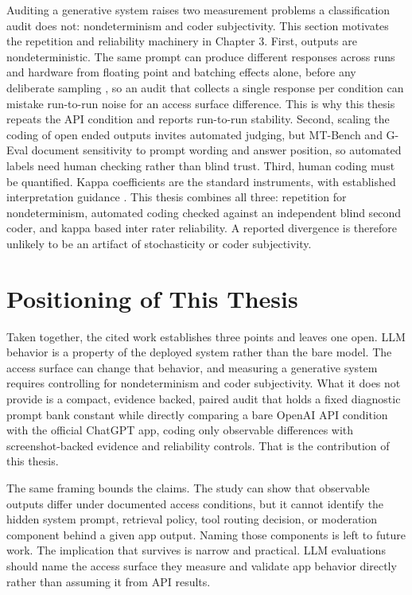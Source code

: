 Auditing a generative system raises two measurement problems a classification
audit does not: nondeterminism and coder subjectivity. This section
motivates the repetition and reliability machinery in Chapter 3. First, outputs
are nondeterministic. The same prompt can produce different responses across runs
and hardware from floating point and batching effects alone, before any deliberate
sampling \parencite{llm_nondeterminism}, so an
audit that collects a single response per condition can mistake run-to-run noise
for an access surface difference. This is why this thesis repeats the API
condition and reports run-to-run stability. Second, scaling the coding of
open ended outputs invites automated judging, but MT-Bench \parencite{mtbench}
and G-Eval \parencite{geval} document sensitivity to prompt wording and answer
position, so automated labels need human checking rather than blind trust. Third,
human coding must be quantified. Kappa coefficients are the standard instruments,
with established interpretation guidance
\parencite{cohen_kappa,fleiss_kappa,mchugh_kappa}. This
thesis combines all three: repetition for nondeterminism, automated coding
checked against an independent blind second coder, and kappa based inter rater
reliability. A reported divergence is therefore unlikely to be an artifact of
stochasticity or coder subjectivity.

\section{Positioning of This Thesis}

Taken together, the cited work establishes three points and leaves one open. LLM
behavior is a property of the deployed system rather than the bare model. The
access surface can change that behavior, and measuring a generative system
requires controlling for nondeterminism and coder subjectivity. What it does not
provide is a compact, evidence backed, paired audit that holds a fixed diagnostic
prompt bank constant while directly comparing a bare OpenAI API condition with the
official ChatGPT app, coding only observable differences with screenshot-backed
evidence and reliability controls. That is the contribution of this thesis.

The same framing bounds the claims. The study can show that observable outputs
differ under documented access conditions, but it cannot identify the hidden
system prompt, retrieval policy, tool routing decision, or moderation component
behind a given app output. Naming those components is left to future work. The
implication that survives is narrow and practical. LLM evaluations should name the
access surface they measure and validate app behavior directly rather than
assuming it from API results.
